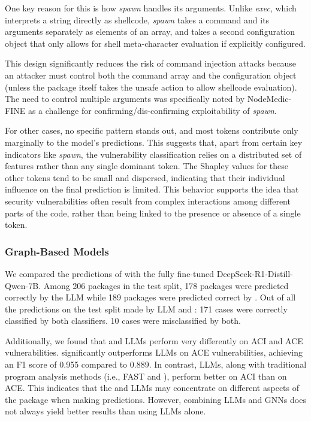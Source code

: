 \documentclass[12pt,openany,oneside,table]{cmuthesis}
\begin{document}
One key reason for this is how \textit{spawn} handles its arguments.
Unlike \textit{exec}, which interprets a string directly as shellcode, 
\textit{spawn} takes a command and its arguments separately as elements of an array,
and takes a second configuration object that only allows for shell meta-character
evaluation if explicitly configured.

This design significantly reduces the risk of command injection attacks because
an attacker must control both the command array and the configuration object
(unless the package itself takes the unsafe action to allow shellcode evaluation).
The need to control multiple arguments was specifically noted by NodeMedic-FINE
as a challenge for confirming/dis-confirming exploitability of \textit{spawn}. 


For other cases, no specific pattern stands out, and most tokens contribute only marginally to the model’s predictions. This suggests that, apart from certain key indicators like \textit{spawn}, the vulnerability classification relies on a distributed set of features rather than any single dominant token. The Shapley values for these other tokens tend to be small and dispersed, indicating that their individual influence on the final prediction is limited.
This behavior supports the idea that security vulnerabilities often result from complex interactions among different parts of the code, rather than being linked to the presence or absence of a single token.

\subsubsection*{Graph-Based Models}
We compared the predictions of  with the fully fine-tuned DeepSeek-R1-Distill-Qwen-7B. Among 206 packages in the test split, 178 packages were predicted correctly by the LLM while 189 packages were predicted correct by .
Out of all the predictions on the test split made by LLM and :
171 cases were correctly classified by both classifiers.
10 cases were misclassified by both.

Additionally, we found that  and LLMs perform very differently on ACI and ACE vulnerabilities.  significantly outperforms LLMs on ACE vulnerabilities, achieving an F1 score of 0.955 compared to 0.889. In contrast, LLMs, along with traditional program analysis methods (i.e., FAST and \nodemedicfine), perform better on ACI than on ACE. This indicates that the  and LLMs may concentrate on different aspects of the package when making predictions. However, combining LLMs and GNNs does not always yield better results than using LLMs alone.
\end{document}
